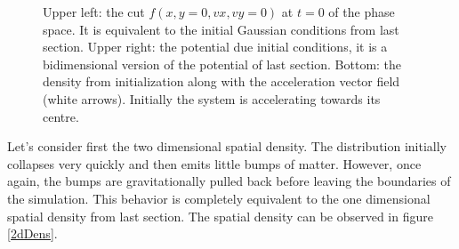 {\begin{figure}[h!]
    \caption{Upper left: the cut $f(x,y=0,vx,vy=0)$ at $t=0$ of the phase space. It is equivalent to the initial Gaussian conditions from last section. Upper right: the potential due initial conditions, it is a bidimensional version of the potential of last section. Bottom: the density from initialization along with the acceleration vector field (white arrows). Initially the system is accelerating towards its centre. }
    \label{2dInit}
\end{figure}

Let's consider first the two dimensional spatial density. The distribution initially collapses very quickly and then emits little bumps of matter. However, once again, the bumps are gravitationally pulled back before leaving the boundaries of the simulation. This behavior is completely equivalent to the one dimensional spatial density from last section. The spatial density can be observed in figure \ref{2dDens}.

}
